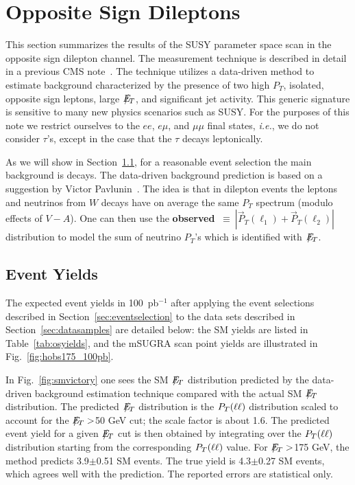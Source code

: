 \section{Opposite Sign Dileptons}
\label{sec:osstudies}

This section summarizes the results of the SUSY parameter space scan
in the opposite sign dilepton channel. The measurement technique is
described in detail in a previous CMS note~\cite{osnote}. The technique
utilizes a data-driven method to estimate background characterized
by the presence of two high $P_T$, isolated, opposite sign leptons,
large $E\!\!\!\!/_T$, and significant jet activity. This generic signature is
sensitive to many new physics scenarios such as SUSY.  For the purposes
of this note we restrict ourselves to the $ee$, $e\mu$, and $\mu\mu$
final states, {\em i.e.}, we do not consider $\tau$'s, except in the
case that the $\tau$ decays leptonically. 

As we will show in Section~\ref{sec:osyields}, for a reasonable event
selection the main background is \ttbar decays. The data-driven
background prediction is based on a suggestion by Victor
Pavlunin~\cite{victor}. The idea is that in dilepton \ttbar events
the leptons and neutrinos from $W$ decays have on average the same
$P_T$ spectrum (modulo effects of $V-A$). One can then use the {\bf
observed} \ptll $~\equiv~|\vec{P}_T(\ell_1) + \vec{P}_T(\ell_2)|$
distribution to model the sum of neutrino $P_T$'s which is identified
with $E\!\!\!\!/_T$. 

\subsection{Event Yields}
\label{sec:osyields}

The expected event yields in 100~pb$^{-1}$ after applying the event selections
described in Section~\ref{sec:eventselection} to the data sets described in
Section~\ref{sec:datasamples} are detailed below: the SM yields are listed in
Table~\ref{tab:osyields}, and the mSUGRA scan point yields are illustrated in
Fig.~\ref{fig:hobs175_100pb}.

In Fig.~\ref{fig:smvictory} one sees the SM $E\!\!\!\!/_T$ distribution predicted
by the data-driven background estimation technique compared with the actual 
SM $E\!\!\!\!/_T$ distribution. The predicted $E\!\!\!\!/_T$ distribution
is the $P_T(\ell\ell)$ distribution scaled to account for the $E\!\!\!\!/_T>$50 GeV cut; the scale
factor is about 1.6. The predicted event yield for a given $E\!\!\!\!/_T$ cut is then obtained by integrating
over the $P_T(\ell\ell)$ distribution starting from the corresponding $P_T(\ell\ell)$ value. 
For $E\!\!\!\!/_T>$175 GeV, the method predicts
3.9$\pm$0.51 SM events. The true yield is 4.3$\pm$0.27 SM events, which agrees
well with the prediction. The reported errors are statistical only.

